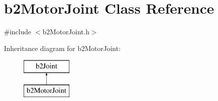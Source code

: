 \hypertarget{classb2_motor_joint}{}\section{b2\+Motor\+Joint Class Reference}
\label{classb2_motor_joint}


{\ttfamily \#include $<$b2\+Motor\+Joint.\+h$>$}

Inheritance diagram for b2\+Motor\+Joint\+:\begin{figure}[H]
\begin{center}
\leavevmode
\includegraphics[height=2.000000cm]{classb2_motor_joint}
\end{center}
\end{figure}
